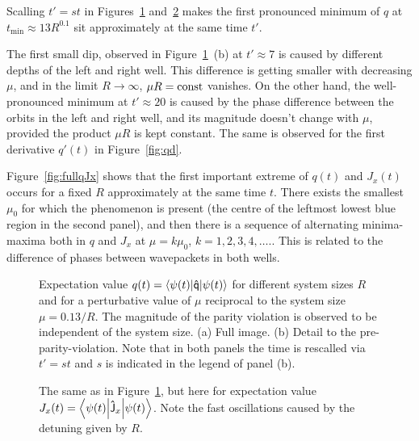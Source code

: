 \documentclass[a4paper,11pt,twoside]{article}
\begin{document}
Scalling $t'=st$ in Figures~\ref{fig:q} and~\ref{fig:Jx} makes the first pronounced minimum of $q$ at $t_{\mathrm{min}}\approx13R^{0.1}$ sit approximately at the same time $t'$.

The first small dip, observed in Figure~\ref{fig:q}~(b) at $t'\approx7$ is caused by different depths of the left and right well. 
This difference is getting smaller with decreasing $\mu$, and in the limit $R\rightarrow\infty$, $\mu R=\mathrm{const}$ vanishes.
On the other hand, the well-pronounced minimum at $t'\approx20$ is caused by the phase difference between the orbits in the left and right well, and its magnitude doesn't change with $\mu$, provided the product $\mu R$ is kept constant.
The same is observed for the first derivative $q'(t)$ in Figure~\ref{fig:qd}.

Figure~\ref{fig:fullqJx} shows that the first important extreme of $q(t)$ and $J_{x}(t)$ occurs for a fixed $R$ approximately at the same time $t$.
There exists the smallest $\mu_0$ for which the phenomenon is present (the centre of the leftmost lowest blue region in the second panel), and then there is a sequence of alternating minima-maxima both in $q$ and $J_{x}$ at $\mu=k\mu_{0}$, $k=1,2,3,4,\dotsc.$.
This is related to the difference of phases between wavepackets in both wells.

\begin{figure}[!h]
        \begin{subfigure}{0.49\linewidth}
            \centering{}
        \end{subfigure}
        \hfill
        \begin{subfigure}{0.49\linewidth}
            \centering{}
        \end{subfigure}
		\caption{Expectation value $q(t)=\left\langle{\psi(t)}\middle|{\mathsf{\hat{q}}}\middle|{\psi(t)}\right\rangle$ for different system sizes $R$ and for a perturbative value of $\mu$ reciprocal to the system size $\mu=0.13/R$.
		The magnitude of the parity violation is observed to be independent of the system size. (a) Full image. (b) Detail to the pre-parity-violation. 
		Note that in both panels the time is rescalled via $t'=st$ and $s$ is indicated in the legend of panel (b).}
		\label{fig:q}
	\end{figure}   	

	\begin{figure}[!h]
        \begin{subfigure}{0.49\linewidth}
            \centering{}
        \end{subfigure}
        \hfill
        \begin{subfigure}{0.49\linewidth}
            \centering{}
        \end{subfigure}
		\caption{The same as in Figure~\ref{fig:q}, but here for expectation value $J_{x}(t)=\left\langle{\psi(t)}\middle|{\mathsf{\hat{J}}_{x}}\middle|{\psi(t)}\right\rangle$.
		Note the fast oscillations caused by the detuning given by $R$.}
		\label{fig:Jx}
	\end{figure}   	
\end{document}
